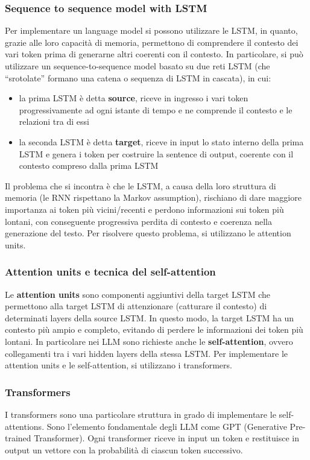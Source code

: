 \subsubsection*{Sequence to sequence model with LSTM}
Per implementare un language model si possono utilizzare le LSTM, in quanto, grazie alle loro capacità di memoria, permettono di
comprendere il contesto dei vari token prima di generarne altri coerenti con il contesto. In particolare, si può utilizzare un
sequence-to-sequence model basato su due reti LSTM (che ``srotolate'' formano una catena o sequenza di LSTM in cascata), in cui:
\begin{itemize}
	\item la prima LSTM è detta \textbf{source}, riceve in ingresso i vari token progressivamente ad ogni istante di tempo
	e ne comprende il contesto e le relazioni tra di essi
	\item la seconda LSTM è detta \textbf{target}, riceve in input lo stato interno della prima LSTM e genera i token per
	costruire la sentence di output, coerente con il contesto compreso dalla prima LSTM
\end{itemize}
Il problema che si incontra è che le LSTM, a causa della loro struttura di memoria (le RNN rispettano la Markov assumption),
rischiano di dare maggiore importanza ai token più vicini/recenti e perdono informazioni sui token più lontani, con
conseguente progressiva perdita di contesto e coerenza nella generazione del testo. Per risolvere questo problema,
si utilizzano le attention units.

\subsubsection*{Attention units e tecnica del self-attention}
Le \textbf{attention units} sono componenti aggiuntivi della target LSTM che permettono alla target LSTM di attenzionare
(catturare il contesto) di determinati layers della source LSTM. In questo modo, la target LSTM ha un contesto più ampio
e completo, evitando di perdere le informazioni dei token più lontani. In particolare nei LLM sono richieste anche le
\textbf{self-attention}, ovvero collegamenti tra i vari hidden layers della stessa LSTM. Per implementare le attention
units e le self-attention, si utilizzano i transformers.

\subsubsection*{Transformers}
I transformers sono una particolare struttura in grado di implementare le self-attentions. Sono l'elemento fondamentale degli
LLM come GPT (Generative Pre-trained Transformer). Ogni transformer riceve in input un token e restituisce in output un vettore
con la probabilità di ciascun token successivo.

